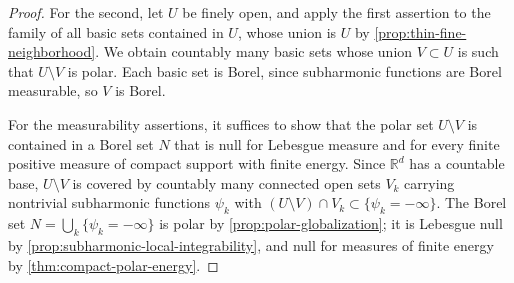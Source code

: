 \begin{proof}
For the second, let $U$ be finely open, and apply the first assertion to the family of all basic sets contained in $U$, whose union is $U$ by \cref{prop:thin-fine-neighborhood}. We obtain countably many basic sets whose union $V\subset U$ is such that $U\setminus V$ is polar. Each basic set is Borel, since subharmonic functions are Borel measurable, so $V$ is Borel.

For the measurability assertions, it suffices to show that the polar set $U\setminus V$ is contained in a Borel set $N$ that is null for Lebesgue measure and for every finite positive measure of compact support with finite energy. Since $\mathbb R^d$ has a countable base, $U\setminus V$ is covered by countably many connected open sets $V_k$ carrying nontrivial subharmonic functions $\psi_k$ with $(U\setminus V)\cap V_k\subset\{\psi_k=-\infty\}$. The Borel set $N=\bigcup_k\{\psi_k=-\infty\}$ is polar by \cref{prop:polar-globalization}; it is Lebesgue null by \cref{prop:subharmonic-local-integrability}, and null for measures of finite energy by \cref{thm:compact-polar-energy}.
\end{proof}

